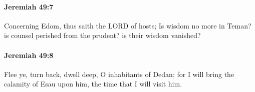 		\paragraph{Jeremiah 49:7} %
			\label{JEREMIAH-49-7}

			Concerning Edom, thus saith the LORD of hosts; Is wisdom no more in Teman? is counsel perished from the prudent? is their wisdom vanished?


		\paragraph{Jeremiah 49:8} %
			\label{JEREMIAH-49-8}

			Flee ye, turn back, dwell deep, O inhabitants of Dedan; for I will bring the calamity of Esau upon him, the time that I will visit him.


